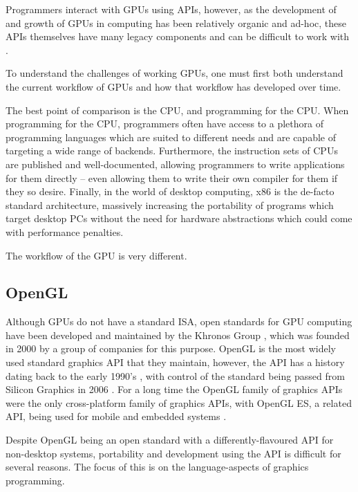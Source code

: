 \documentclass[a4paper,12pt,twoside,openright]{report}
\begin{document}
Programmers interact with GPUs using APIs, however, as the development of and
growth of GPUs in computing has been relatively organic and ad-hoc, these APIs
themselves have many legacy components and can be difficult to work with
\cite{NVIDIAInternshipLessons}.


To understand the challenges of working GPUs, one must first both understand
the current workflow of GPUs and how that workflow has developed over time.

The best point of comparison is the CPU, and programming for the CPU. When
programming for the CPU, programmers often have access to a plethora of
programming languages which are suited to different needs and are capable of
targeting a wide range of backends. Furthermore, the instruction sets of CPUs
are published and well-documented, allowing programmers to write applications
for them directly -- even allowing them to write their own compiler for them
if they so desire. Finally, in the world of desktop computing, x86 is the
de-facto standard architecture, massively increasing the portability of
programs which target desktop PCs without the need for hardware abstractions
which could come with performance penalties.

The workflow of the GPU is very different.

\subsection{OpenGL}

Although GPUs do not have a standard ISA, open standards for GPU computing have
been developed and maintained by the Khronos Group \cite{TODO}, which was
founded in 2000 by a group of companies for this purpose. OpenGL is the most
widely used standard graphics API that they maintain, however, the API has a
history dating back to the early 1990's \cite{TODO}, with control of the
standard being passed from Silicon Graphics in 2006 \cite{TODO}. For a long
time the OpenGL family of graphics APIs were the only cross-platform family of
graphics APIs, with OpenGL ES, a related API, being used for mobile and
embedded systems \cite{TODO}.

Despite OpenGL being an open standard with a differently-flavoured API for
non-desktop systems, portability and development using the API is difficult for
several reasons. The focus of this is on the language-aspects of graphics
programming.
\end{document}
